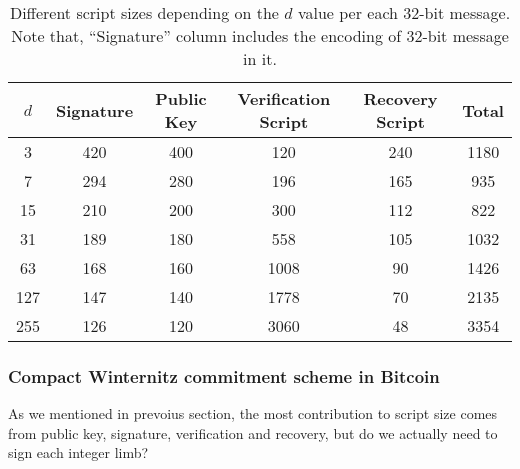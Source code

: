\documentclass{iacrtrans}
\begin{document}
\iffalse{}
\begin{verbatim}
import math
l = 32
ds = [3, 7, 15, 31, 63, 127, 255]

for d in ds:
    w = math.ceil(math.log(d+1, 2))
    n0 = math.ceil(l / w)
    n1 = math.ceil((2**w * n0).bit_length() / w)
    k = n0 + n1

    pk_size = 20 * k
    ver_size = 2 * d * k
    sig_size = 21*k
    rec_size = 0
    for i in range(0, n0):
        rec_size += int(i * w)

    total = pk_size + ver_size + rec_size + sig_size

    print(f"{d} & {sig_size} & {pk_size} & {ver_size} & {rec_size} & {total} \\\\")
\end{verbatim}
\fi
\begin{table}[H]
  \centering
  \begin{tabular}{cccccc}
    \toprule
    $d$ & \textbf{Signature} & \textbf{Public Key} &
    \textbf{Verification Script} & \textbf{Recovery Script} & \textbf{Total} \\
    \midrule
    3 & 420 & 400 & 120 & 240 & 1180 \\
    7 & 294 & 280 & 196 & 165 & 935 \\
    15 & 210 & 200 & 300 & 112 & 822 \\
    31 & 189 & 180 & 558 & 105 & 1032 \\
    63 & 168 & 160 & 1008 & 90 & 1426 \\
    127 & 147 & 140 & 1778 & 70 & 2135 \\
    255 & 126 & 120 & 3060 & 48 & 3354 \\
    \bottomrule
  \end{tabular}
  \caption{Different script sizes depending on the $d$ value per each
    32-bit message. Note that, ``Signature'' column includes the
  encoding of 32-bit message in it.}\label{tab:winternitz-script-size}
\end{table}

\subsubsection{Compact Winternitz commitment
scheme in Bitcoin}\label{sec:compact-winternitz-in-bitcoin}

As we mentioned in prevoius section, the most contribution to script
size comes from public key, signature, verification and recovery, but
do we actually need to sign each integer limb?
\end{document}
